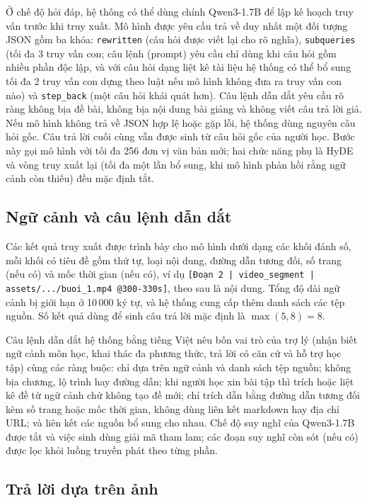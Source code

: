 Ở chế độ hỏi đáp, hệ thống có thể dùng chính Qwen3-1.7B để lập kế hoạch truy vấn trước khi truy xuất. Mô hình được yêu cầu trả về duy nhất một đối tượng JSON gồm ba khóa: \texttt{rewritten} (câu hỏi được viết lại cho rõ nghĩa), \texttt{subqueries} (tối đa 3 truy vấn con; câu lệnh (prompt) yêu cầu chỉ dùng khi câu hỏi gồm nhiều phần độc lập, và với câu hỏi dạng liệt kê tài liệu hệ thống có thể bổ sung tối đa 2 truy vấn con dựng theo luật nếu mô hình không đưa ra truy vấn con nào) và \texttt{step\_back} (một câu hỏi khái quát hơn). Câu lệnh dẫn dắt yêu cầu rõ ràng không bịa đề bài, không bịa nội dung bài giảng và không viết câu trả lời giả. Nếu mô hình không trả về JSON hợp lệ hoặc gặp lỗi, hệ thống dùng nguyên câu hỏi gốc. Câu trả lời cuối cùng vẫn được sinh từ câu hỏi gốc của người học. Bước này gọi mô hình với tối đa 256 đơn vị văn bản mới; hai chức năng phụ là HyDE và vòng truy xuất lại (tối đa một lần bổ sung, khi mô hình phản hồi rằng ngữ cảnh còn thiếu) đều mặc định tắt.

\subsection{Ngữ cảnh và câu lệnh dẫn dắt}

Các kết quả truy xuất được trình bày cho mô hình dưới dạng các khối đánh số, mỗi khối có tiêu đề gồm thứ tự, loại nội dung, đường dẫn tương đối, số trang (nếu có) và mốc thời gian (nếu có), ví dụ \texttt{[Đoạn 2 | video\_segment | assets/.../buoi\_1.mp4 @300-330s]}, theo sau là nội dung. Tổng độ dài ngữ cảnh bị giới hạn ở 10\,000 ký tự, và hệ thống cung cấp thêm danh sách các tệp nguồn. Số kết quả dùng để sinh câu trả lời mặc định là $\max(5, 8)=8$.

\bigbreak\noindent
Câu lệnh dẫn dắt hệ thống bằng tiếng Việt nêu bốn vai trò của trợ lý (nhận biết ngữ cảnh môn học, khai thác đa phương thức, trả lời có căn cứ và hỗ trợ học tập) cùng các ràng buộc: chỉ dựa trên ngữ cảnh và danh sách tệp nguồn; không bịa chương, lộ trình hay đường dẫn; khi người học xin bài tập thì trích hoặc liệt kê đề từ ngữ cảnh chứ không tạo đề mới; chỉ trích dẫn bằng đường dẫn tương đối kèm số trang hoặc mốc thời gian, không dùng liên kết markdown hay địa chỉ URL; và liên kết các nguồn bổ sung cho nhau. Chế độ suy nghĩ của Qwen3-1.7B được tắt và việc sinh dùng giải mã tham lam; các đoạn suy nghĩ còn sót (nếu có) được lọc khỏi luồng truyền phát theo từng phần.

\subsection{Trả lời dựa trên ảnh}

